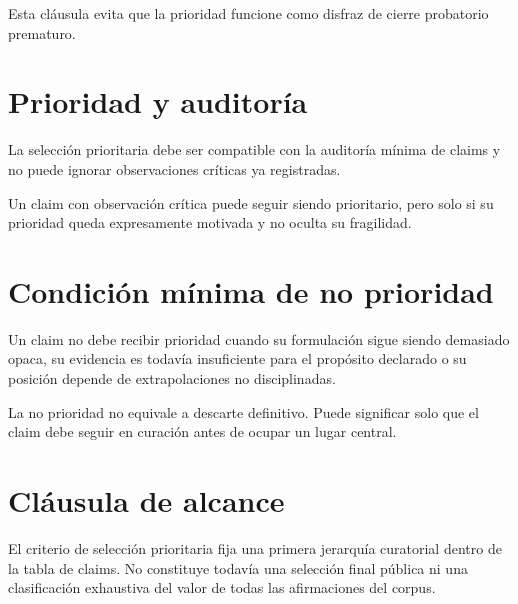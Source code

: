 \begin{observation}
Esta cláusula evita que la prioridad funcione como disfraz de cierre probatorio prematuro.
\end{observation}

\section{Prioridad y auditoría}
\begin{definition}
La selección prioritaria debe ser compatible con la auditoría mínima de claims y no puede ignorar observaciones críticas ya registradas.
\end{definition}

\begin{observation}
Un claim con observación crítica puede seguir siendo prioritario, pero solo si su prioridad queda expresamente motivada y no oculta su fragilidad.
\end{observation}

\section{Condición mínima de no prioridad}
\begin{definition}
Un claim no debe recibir prioridad cuando su formulación sigue siendo demasiado opaca, su evidencia es todavía insuficiente para el propósito declarado o su posición depende de extrapolaciones no disciplinadas.
\end{definition}

\begin{observation}
La no prioridad no equivale a descarte definitivo. Puede significar solo que el claim debe seguir en curación antes de ocupar un lugar central.
\end{observation}

\section{Cláusula de alcance}
\begin{observation}
El criterio de selección prioritaria fija una primera jerarquía curatorial dentro de la tabla de claims. No constituye todavía una selección final pública ni una clasificación exhaustiva del valor de todas las afirmaciones del corpus.
\end{observation}

